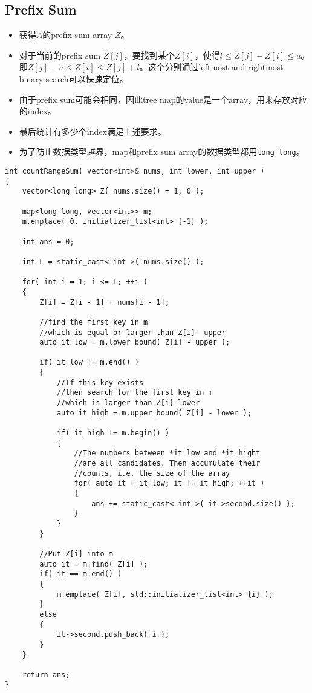 \subsection{Prefix Sum}
\begin{itemize}
\item 获得$A$的prefix sum array $Z$。
\item 对于当前的prefix sum $Z[j]$，要找到某个$Z[i]$，使得$l\leq Z[j]-Z[i]\leq u$。即$Z[j]-u\leq Z[i]\leq Z[j]+l$。这个分别通过leftmost and rightmost binary search可以快速定位。
\item 由于prefix sum可能会相同，因此tree map的value是一个array，用来存放对应的index。
\item 最后统计有多少个index满足上述要求。
\item 为了防止数据类型越界，map和prefix sum array的数据类型都用\texttt{long long}。
\end{itemize}
\setcounter{lstlisting}{0}
\begin{lstlisting}[style=customc, caption={Tree Map And Binary Search}]
int countRangeSum( vector<int>& nums, int lower, int upper )
{
    vector<long long> Z( nums.size() + 1, 0 );

    map<long long, vector<int>> m;
    m.emplace( 0, initializer_list<int> {-1} );

    int ans = 0;

    int L = static_cast< int >( nums.size() );

    for( int i = 1; i <= L; ++i )
    {
        Z[i] = Z[i - 1] + nums[i - 1];

        //find the first key in m
        //which is equal or larger than Z[i]- upper
        auto it_low = m.lower_bound( Z[i] - upper );

        if( it_low != m.end() )
        {
            //If this key exists
            //then search for the first key in m
            //which is larger than Z[i]-lower
            auto it_high = m.upper_bound( Z[i] - lower );

            if( it_high != m.begin() )
            {
                //The numbers between *it_low and *it_hight
                //are all candidates. Then accumulate their
                //counts, i.e. the size of the array
                for( auto it = it_low; it != it_high; ++it )
                {
                    ans += static_cast< int >( it->second.size() );
                }
            }
        }

        //Put Z[i] into m
        auto it = m.find( Z[i] );
        if( it == m.end() )
        {
            m.emplace( Z[i], std::initializer_list<int> {i} );
        }
        else
        {
            it->second.push_back( i );
        }
    }

    return ans;
}
\end{lstlisting}

